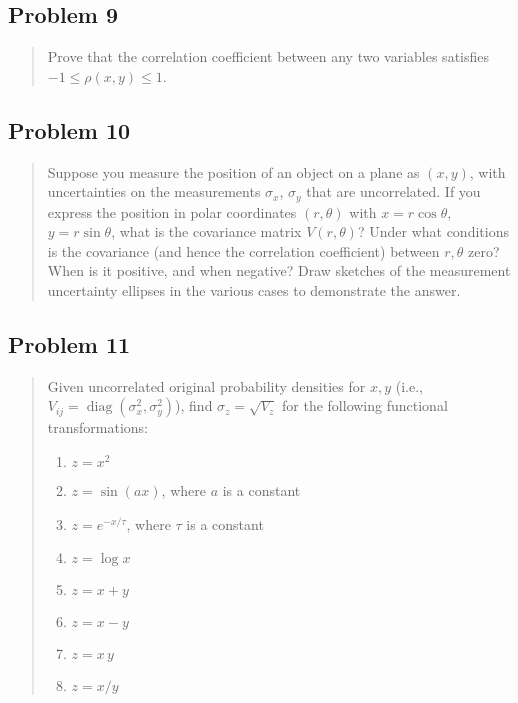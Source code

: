 \subsection*{Problem 9}
\begin{quote}
Prove that the correlation coefficient between any two variables satisfies $-1\le \rho(x,y)\le 1$.
\end{quote}

\subsection*{Problem 10}
\begin{quote}
Suppose you measure the position of an object on a plane as $(x,y)$, with uncertainties on the measurements $\sigma_x$, $\sigma_y$ that are uncorrelated. If you express the position in polar coordinates $(r,\theta)$ with $x=r\cos\theta$, $y=r\sin\theta$, what is the covariance matrix $V(r,\theta)$? Under what conditions is the covariance (and hence the correlation coefficient) between $r,\theta$ zero? When is it positive, and when negative? Draw sketches of the measurement uncertainty ellipses in the various cases to demonstrate the answer.
\end{quote}

\subsection*{Problem 11}
\begin{quote}
Given uncorrelated original probability densities for $x,y$ (i.e., $V_{ij}=\operatorname{diag}(\sigma_x^2,\sigma_y^2)$), find $\sigma_z=\sqrt{V_z}$ for the following functional transformations:
\begin{enumerate}[label=(\alph*)]
	\item $z=x^2$
	\item $z=\sin(a x)$, where $a$ is a constant
	\item $z=e^{-x/\tau}$, where $\tau$ is a constant
	\item $z=\log x$
	\item $z=x+y$
	\item $z=x-y$
	\item $z=x\,y$
	\item $z=x/y$
\end{enumerate}
\end{quote}


